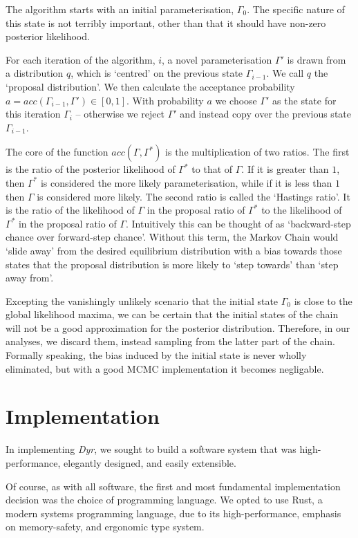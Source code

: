 \documentclass[10pt,journal,compsoc]{IEEEtran}
\begin{document}
The algorithm starts with an initial parameterisation, $\Gamma_0$. The specific nature of this state is not terribly important, other than that it should have non-zero posterior likelihood.

For each iteration of the algorithm, $i$, a novel parameterisation $\Gamma'$ is drawn from a distribution $q$, which is `centred' on the previous state $\Gamma_{i-1}$. We call $q$ the `proposal distribution'. We then calculate the acceptance probability $a = acc(\Gamma_{i-1}, \Gamma') \in [0, 1]$. With probability $a$ we choose $\Gamma'$ as the state for this iteration $\Gamma_i$ -- otherwise we reject $\Gamma'$ and instead copy over the previous state $\Gamma_{i-1}$.

The core of the function $acc(\Gamma, \Gamma^*)$ is the multiplication of two ratios. The first is the ratio of the posterior likelihood of $\Gamma^*$ to that of $\Gamma$. If it is greater than $1$, then $\Gamma^*$ is considered the more likely parameterisation, while if it is less than $1$ then $\Gamma$ is considered more likely. The second ratio is called the `Hastings ratio'. It is the ratio of the likelihood of $\Gamma$ in the proposal ratio of $\Gamma^*$ to the likelihood of $\Gamma^*$ in the proposal ratio of $\Gamma$. Intuitively this can be thought of as `backward-step chance over forward-step chance'. Without this term, the Markov Chain would `slide away' from the desired equilibrium distribution with a bias towards those states that the proposal distribution is more likely to `step towards' than `step away from'.

Excepting the vanishingly unlikely scenario that the initial state $\Gamma_0$ is close to the global likelihood maxima, we can be certain that the initial states of the chain will not be a good approximation for the posterior distribution. Therefore, in our analyses, we discard them, instead sampling from the latter part of the chain. Formally speaking, the bias induced by the initial state is never wholly eliminated, but with a good MCMC implementation it becomes negligable.

\section{Implementation}

In implementing \textit{Dyr}, we sought to build a software system that was high-performance, elegantly designed, and easily extensible.

Of course, as with all software, the first and most fundamental implementation decision was the choice of programming language. We opted to use Rust, a modern systems programming language, due to its high-performance, emphasis on memory-safety, and ergonomic type system.
\end{document}

